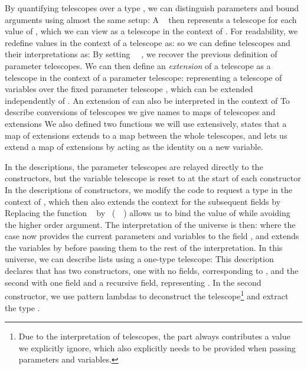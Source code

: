 By quantifying telescopes over a type \cite{practgen, sijsling}, we can distinguish parameters and bound arguments using almost the same setup:
A \  then represents a telescope for each value of , which we can view as a telescope in the context of . For readability, we redefine values in the context of a telescope as:
so we can define telescopes and their interpretations as:
By setting \ \AV{=}\ , we recover the previous definition of parameter telescopes. We can then define an \emph{extension} of a telescope as a telescope in the context of a parameter telescope:
representing a telescope of variables  over the fixed parameter telescope , which can be extended independently of . An extension of  can also be interpreted in the context of  
To describe conversions of telescopes we give names to maps of telescopes and extensions
We also defined two functions we will use extensively,  states that a map of extensions extends to a map between the whole telescopes, and  lets us extend a map of extensions by acting as the identity on a new variable. 

In the descriptions, the parameter telescopes are relayed directly to the constructors, but the variable telescope is reset to  at the start of each constructor
In the descriptions of constructors, we modify the  code to request a type  in the context of , which then also extends the context for the subsequent fields by 
Replacing the function \  by \ (\ \ ) allows us to bind the value of  while avoiding the higher order argument. The interpretation of the universe is then:
where the  case now provides the current parameters and variables to the field , and extends the variables by  before passing them to the rest of the interpretation. In this universe, we can describe lists using a one-type telescope:
This description declares that  has two constructors, one with no fields, corresponding to \AIC{[]}, and the second with one field and a recursive field, representing . In the second constructor, we use pattern lambdas to deconstruct the telescope\footnote{Due to the interpretation of telescopes, the  part always contributes a value  we explicitly ignore, which also explicitly needs to be provided when passing parameters and variables.} and extract the type . 

